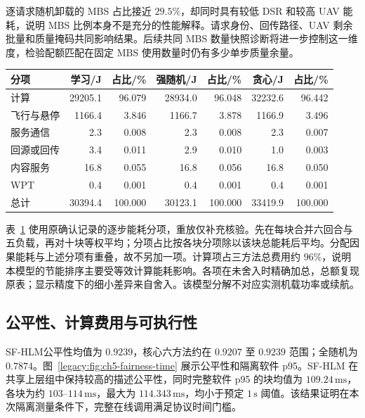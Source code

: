 逐请求随机卸载的 MBS 占比接近 $29.5\%$，却同时具有较低 DSR 和较高 UAV 能耗，说明 MBS 比例本身不是充分的性能解释。请求身份、回传路径、UAV 剩余批量和质量掩码共同影响结果。后续共同 MBS 数量快照诊断将进一步控制这一维度，检验配额匹配在固定 MBS 使用数量时仍有多少单步质量余量。

\begin{table}[!htbp]
 \centering
 \label{legacy:tab:ch5-energy-components}
 \small
 \setlength{\tabcolsep}{4pt}
 \begin{tabular}{lrrrrrr}
  \toprule
  分项 & 学习/J & 占比/\% & 强随机/J & 占比/\% & 贪心/J & 占比/\% \\
  \midrule
  计算 & 29205.1 & 96.079 & 28934.0 & 96.048 & 32232.6 & 96.442 \\
  飞行与悬停 & 1166.4 & 3.846 & 1166.7 & 3.878 & 1166.9 & 3.496 \\
  服务通信 & 2.3 & 0.008 & 2.3 & 0.008 & 2.3 & 0.007 \\
  回源或回传 & 3.4 & 0.011 & 2.9 & 0.010 & 1.0 & 0.003 \\
  内容服务 & 16.8 & 0.055 & 16.8 & 0.056 & 16.8 & 0.050 \\
  WPT & 0.4 & 0.001 & 0.4 & 0.001 & 0.4 & 0.001 \\
  \midrule
  总计 & 30394.4 & 100.000 & 30123.1 & 100.000 & 33419.9 & 100.000 \\
  \bottomrule
 \end{tabular}
\end{table}

表~\ref{legacy:tab:ch5-energy-components} 使用原确认记录的逐步能耗分项，重放仅补充核验。先在每块合并六回合与五负载，再对十块等权平均；分项占比按各块分项除以该块总能耗后平均。分配因果能耗与上述分项有重叠，故不另加一项。计算项占三方法总费用约 $96\%$，说明本模型的节能排序主要受等效计算能耗影响。各项在未舍入时精确加总，总额复现原表；显示精度下的细小差异来自舍入。该模型分解不对应实测机载功率或续航。

\subsection{公平性、计算费用与可执行性}

SF-HLM公平性均值为 $0.9239$，核心六方法约在 $0.9207$ 至 $0.9239$ 范围；全随机为 $0.7874$。图~\ref{legacy:fig:ch5-fairness-time} 展示公平性和隔离软件 p95。SF-HLM 在共享上层组中保持较高的描述公平性，同时完整软件 p95 的块均值为 $109.24\,\mathrm{ms}$，各块为约 $103$--$114\,\mathrm{ms}$，最大为 $114.343\,\mathrm{ms}$，均小于预定 $1\,\mathrm{s}$ 阈值。该结果证明在本次隔离测量条件下，完整在线调用满足协议时间门槛。

